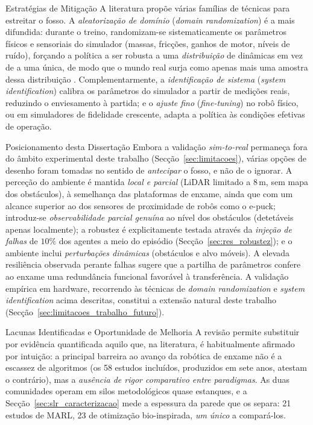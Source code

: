 \documentclass[12pt,reqno, twoside]{amsbook}
\makeatletter
\def\section{\@startsection{section}{1}%
      \z@{.5\linespacing\@plus.7\linespacing}{.25\linespacing}%
      {\normalfont\bfseries\flushleft}}
\def\subsection{\@startsection{subsection}{2}%
      \z@{.5\linespacing\@plus.7\linespacing}{.25\linespacing}%
      {\normalfont\bfseries\flushleft}}
\theoremstyle{plain}
\numberwithin{equation}{chapter}
\numberwithin{section}{chapter}
\numberwithin{table}{chapter}
\numberwithin{figure}{chapter}
\makeatother
\begin{document}
\subsection{Estratégias de Mitigação}
A literatura propõe várias famílias de técnicas para estreitar o fosso. A \emph{aleatorização de domínio} (\textit{domain randomization}) é a mais difundida: durante o treino, randomizam-se sistematicamente os parâmetros físicos e sensoriais do simulador (massas, fricções, ganhos de motor, níveis de ruído), forçando a política a ser robusta a uma \emph{distribuição} de dinâmicas em vez de a uma única, de modo que o mundo real surja como apenas mais uma amostra dessa distribuição \cite{tobin2017domain}. Complementarmente, a \emph{identificação de sistema} (\textit{system identification}) calibra os parâmetros do simulador a partir de medições reais, reduzindo o enviesamento à partida; e o \emph{ajuste fino} (\textit{fine-tuning}) no robô físico, ou em simuladores de fidelidade crescente, adapta a política às condições efetivas de operação.

\subsection{Posicionamento desta Dissertação}
Embora a validação \textit{sim-to-real} permaneça fora do âmbito experimental deste trabalho (Secção~\ref{sec:limitacoes}), várias opções de desenho foram tomadas no sentido de \emph{antecipar} o fosso, e não de o ignorar. A perceção do ambiente é mantida \emph{local e parcial} (LiDAR limitado a $8$\,m, sem mapa dos obstáculos), à semelhança das plataformas de enxame, ainda que com um alcance superior ao dos sensores de proximidade de robôs como o e-puck; introduz-se \emph{observabilidade parcial genuína} ao nível dos obstáculos (detetáveis apenas localmente); a robustez é explicitamente testada através da \emph{injeção de falhas} de $10\%$ dos agentes a meio do episódio (Secção~\ref{sec:res_robustez}); e o ambiente inclui \emph{perturbações dinâmicas} (obstáculos e alvo móveis). A elevada resiliência observada perante falhas sugere que a partilha de parâmetros confere ao enxame uma redundância funcional favorável à transferência. A validação empírica em hardware, recorrendo às técnicas de \textit{domain randomization} e \textit{system identification} acima descritas, constitui a extensão natural deste trabalho (Secção~\ref{sec:limitacoes_trabalho_futuro}).

\section{Lacunas Identificadas e Oportunidade de Melhoria}
\label{sec:slr_lacunas}
A revisão permite substituir por evidência quantificada aquilo que, na literatura, é habitualmente afirmado por intuição: a principal barreira ao avanço da robótica de enxame não é a escassez de algoritmos (os 58 estudos incluídos, produzidos em sete anos, atestam o contrário), mas a \emph{ausência de rigor comparativo entre paradigmas}. As duas comunidades operam em silos metodológicos quase estanques, e a Secção~\ref{sec:slr_caracterizacao} mede a espessura da parede que os separa: 21 estudos de MARL, 23 de otimização bio-inspirada, \emph{um único} a compará-los.
\end{document}
